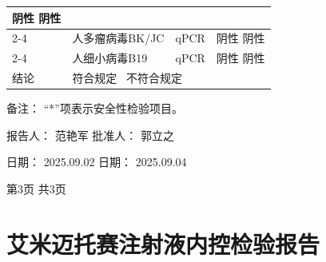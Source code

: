 \documentclass[UTF8,10pt,a4paper,fontset=fandol]{ctexart}
\newcommand{\fieldvalue}[1]{#1}
\newcommand{\handwritten}[1]{#1}
\begin{document}
\begin{tabularx}{\textwidth}{|p{2.2cm}|X|p{2.0cm}|X|}
\fieldvalue{阴性}
\quad
\fieldvalue{阴性}
\\ \cline{2-4}
&
\fieldvalue{人多瘤病毒BK/JC}
&
\fieldvalue{qPCR}
&
\fieldvalue{阴性}
\quad
\fieldvalue{阴性}
\\ \cline{2-4}
&
\fieldvalue{人细小病毒B19}
&
\fieldvalue{qPCR}
&
\fieldvalue{阴性}
\quad
\fieldvalue{阴性}
\\ \hline
结论 &
\multicolumn{3}{l|}{
符合规定 \qquad
\fieldvalue{\handwritten{\checkmark}}\ 不符合规定
}
\\ \hline
\end{tabularx}

\medskip

备注： “*”项表示安全性检验项目。

\begin{flushleft}
报告人：
\fieldvalue{\handwritten{范艳军}}
\hfill
批准人：
\fieldvalue{\handwritten{郭立之}}
\end{flushleft}

\begin{flushleft}
日\quad 期：
\fieldvalue{\handwritten{2025.09.02}}
\hfill
日\quad 期：
\fieldvalue{\handwritten{2025.09.04}}
\end{flushleft}

\begin{center}
第3页 共3页
\end{center}

\newpage

\section*{艾米迈托赛注射液内控检验报告}
\end{document}
